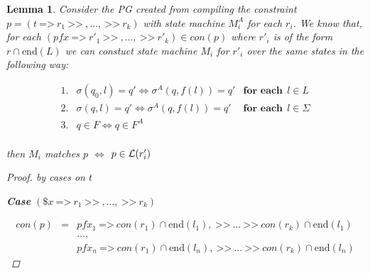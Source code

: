 \documentclass[twocolumn]{sig-alternate-10pt}
\newcommand{\Prefer}{\texttt{>>}}
\newcommand{\Path}{\texttt{=>}}
\newtheorem{lem}[thm]{Lemma}
\begin{document}



\begin{lem}
  Consider the PG created from compiling the constraint $p = (t ~\Path~ r_1 ~\Prefer~,\dots, ~\Prefer~ r_k)$ with state machine $M^A_i$ for each $r_i$. We know that, for each $(pfx ~\Path~ r'_1 ~\Prefer~,\dots, ~\Prefer~ r'_k) \in con(p)$ where $r'_i$ is of the form $r \cap \text{end}(L)$ we can constuct state machine $M_i$ for $r'_i$ over the same states in the following way:
    
    \[ \begin{array}{lll}
      1. & \sigma(q_0,l) = q' \iff \sigma^A(q,f(l)) = q' & \textbf{for each}~~ l \in L \\
      2. & \sigma(q,l) = q' \iff \sigma^A(q,f(l)) = q' & \textbf{for each}~~ l \in \Sigma \\
      3. & q \in F \iff q \in F^A & \\
    \end{array} \]

  then $M_i$ matches $p$ $\iff$ $p \in \mathcal{L}(r_i')$
  
  \vspace{1em}
  \begin{proof} by cases on $t$

    \vspace{1em}

    \textbf{Case} $(\$x ~\Path~ r_1 ~\Prefer~,\dots, ~\Prefer~ r_k)$

    \[ \begin{array}{lcl}
      con(p) &=& pfx_1 ~\Path~ con(r_1) \cap \text{end}(l_1), ~\Prefer~ \dots ~\Prefer~ con(r_k) \cap \text{end}(l_1)  \\
             & & \dots, \\
             & & pfx_n ~\Path~ con(r_1) \cap \text{end}(l_n), ~\Prefer~ \dots ~\Prefer~ con(r_k) \cap \text{end}(l_n)
    \end{array} \]


\end{proof}
\end{lem}
\end{document}
